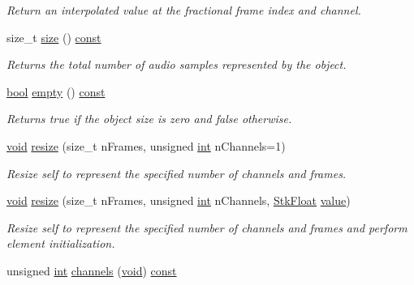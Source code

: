 \begin{DoxyCompactItemize}
\begin{DoxyCompactList}\small\item\em Return an interpolated value at the fractional frame index and channel. \end{DoxyCompactList}\item 
size\+\_\+t \hyperlink{class_nyq_1_1_stk_frames_a1f3565ff6fbb2573b356b55cb44ddeae}{size} () \hyperlink{getopt1_8c_a2c212835823e3c54a8ab6d95c652660e}{const} 
\begin{DoxyCompactList}\small\item\em Returns the total number of audio samples represented by the object. \end{DoxyCompactList}\item 
\hyperlink{mac_2config_2i386_2lib-src_2libsoxr_2soxr-config_8h_abb452686968e48b67397da5f97445f5b}{bool} \hyperlink{class_nyq_1_1_stk_frames_a5d178384b3b4d9c445766dfde121d3e1}{empty} () \hyperlink{getopt1_8c_a2c212835823e3c54a8ab6d95c652660e}{const} 
\begin{DoxyCompactList}\small\item\em Returns {\itshape true} if the object size is zero and {\itshape false} otherwise. \end{DoxyCompactList}\item 
\hyperlink{sound_8c_ae35f5844602719cf66324f4de2a658b3}{void} \hyperlink{class_nyq_1_1_stk_frames_aafb931f34c62db307876b727eb91fdd9}{resize} (size\+\_\+t n\+Frames, unsigned \hyperlink{xmltok_8h_a5a0d4a5641ce434f1d23533f2b2e6653}{int} n\+Channels=1)
\begin{DoxyCompactList}\small\item\em Resize self to represent the specified number of channels and frames. \end{DoxyCompactList}\item 
\hyperlink{sound_8c_ae35f5844602719cf66324f4de2a658b3}{void} \hyperlink{class_nyq_1_1_stk_frames_a23ed64298c1697c4ad8d8a988cb0c75e}{resize} (size\+\_\+t n\+Frames, unsigned \hyperlink{xmltok_8h_a5a0d4a5641ce434f1d23533f2b2e6653}{int} n\+Channels, \hyperlink{namespace_nyq_a044fa20a706520a617bbbf458a7db7e4}{Stk\+Float} \hyperlink{lib_2expat_8h_a4a30a13b813682e68c5b689b45c65971}{value})
\begin{DoxyCompactList}\small\item\em Resize self to represent the specified number of channels and frames and perform element initialization. \end{DoxyCompactList}\item 
unsigned \hyperlink{xmltok_8h_a5a0d4a5641ce434f1d23533f2b2e6653}{int} \hyperlink{class_nyq_1_1_stk_frames_acbc6c5da24845359aeb40fad5c831069}{channels} (\hyperlink{sound_8c_ae35f5844602719cf66324f4de2a658b3}{void}) \hyperlink{getopt1_8c_a2c212835823e3c54a8ab6d95c652660e}{const} 

\end{DoxyCompactItemize}
